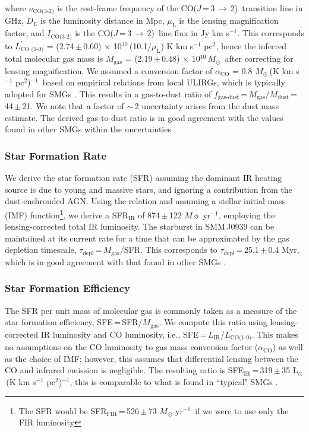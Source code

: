 \documentclass[twocolumn,apj,numberedappendix]{emulateapj}
\newcommand{\Msun}{\mbox{$M_{\odot}$}}
\newcommand{\Lsun}{\mbox{L$_{\odot}$}}
\newcommand{\CO}{\mbox{CO($J$\,=\,3\,$\rightarrow$\,2) }}
\newcommand{\Lp}{\mbox{$L^{\prime}_\textrm{CO(1-0)}$}}
\newcommand{\LpU}{\mbox{K\,\,km\,\,s$^{-1}$\,\,pc$^2$}}
\newcommand{\eg}{{\sl e.g.,~}}
\newcommand{\pmOne}{\mbox{$^{-1}$}}
\begin{document}
where $\nu_\textrm{CO(3-2)}$ is the rest-frame frequency of the \CO transition line in GHz, $D_L$ is the luminosity distance in Mpc, $\mu_\textrm{L}$ is the lensing magnification factor, and $I_\textrm{CO(3-2)}$ is the \CO line flux in Jy\,\,km\,\,s\pmOne. This corresponds to $L^{\prime}_\textrm{CO (1-0)}$ = (2.74\,$\pm$\,0.60) $\times$\,\,10$^{10}$\,(10.1/$\mu_\textrm{L}$)\,\,\LpU, hence
the inferred total molecular gas mass is $M_\textrm{gas}$ = (2.19\,$\pm$\,0.48) $\times$\,\,10$^{10}$\,\Msun\, after correcting for lensing magnification. We assumed a conversion factor of $\alpha_\textrm{CO}$ = 0.8\,\,\Msun\,(\LpU)\pmOne\ based on empirical relations from local ULIRGs, which is typically
adopted for SMGs \citep[\eg][]{Tacconi06a,Tacconi08a,Bothwell13a}.
This results in a gas-to-dust
ratio of $f_\textrm{gas-dust}$\,=\,$M_\textrm{gas}/M_\textrm{dust}$\,=\,44\,$\pm$\,21. We note that a factor of $\sim$\,2 uncertainty arises from the dust mass estimate. The derived gas-to-dust ratio is in good agreement with the
values found in other SMGs within the uncertainties \citep{Coppin08a,Micha10a,Riechers11c}.

\subsubsection{Star Formation Rate}
We derive the star formation rate (SFR) assuming the dominant IR heating source is due to young and massive stars, and ignoring a contribution from the
dust-enshrouded AGN.
Using the \citet{Kennicutt98a} relation and assuming a \citet{Chabrier03a}
stellar initial mass (IMF) function\footnote{The SFR would be SFR$_\textrm{FIR}$\,=\,526\,$\pm$\,73 $M_
\odot$ yr\pmOne\ if we were to use only the FIR luminosity},
we derive a SFR$_\textrm{IR}$ of 874\,$\pm$\,122 $M\sun$\,\,yr\pmOne, employing the lensing-corrected total IR luminosity.
The starburst in SMM\,J0939 can be maintained at its
current rate for a time that can be approximated by the gas depletion timescale, $\tau_\textrm{depl}$\,=\,$M_\textrm{gas}$/SFR.
This corresponds to $\tau_\textrm{depl}$\,=\,25.1\,$\pm$\,0.4 Myr, which is in good agreement with that found in other SMGs \citep[\eg][]{Greve05a}.

\subsubsection{Star Formation Efficiency}
The SFR per unit mass of molecular gas is commonly taken as a
measure of the star formation efficiency, SFE\,=\,SFR/$M_\textrm{gas}$. We compute this ratio using lensing-corrected IR
luminosity and CO luminosity, i.e., SFE\,=\,$L_\textrm{IR}$/\Lp. This makes no assumptions on the CO luminosity to gas mass conversion factor ($\alpha_\textrm{CO}$) as well as the
choice of IMF; however, this assumes that differential lensing between the CO and infrared emission is negligible.
The resulting ratio is SFE$_\textrm{IR}$\,=\,319\,$\pm$\,35\,\,\Lsun\,(\LpU)$^{-1}$, this is comparable
to what is found in ``typical" SMGs \citep{Greve05a,Tacconi06a,Riechers11c}.
\end{document}
